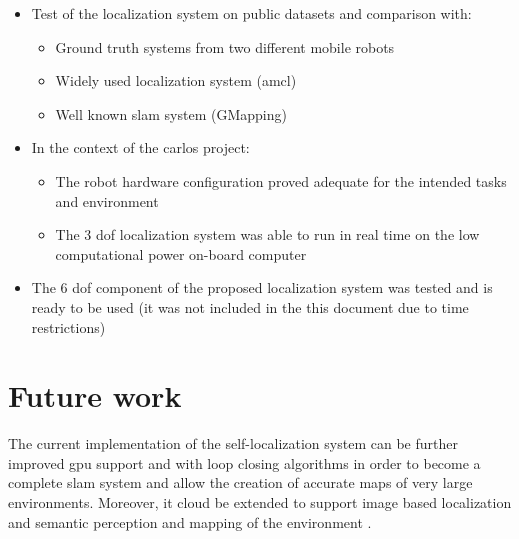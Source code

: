 \begin{itemize}
	\item Test of the localization system on public datasets and comparison with:
	\begin{itemize}
		\item Ground truth systems from two different mobile robots
		\item Widely used localization system (\gls{amcl})
		\item Well known \gls{slam} system (GMapping)
	\end{itemize}
 	
	\item In the context of the \gls{carlos} project:
	\begin{itemize}
		\item The robot hardware configuration proved adequate for the intended tasks and environment
		\item The 3 \gls{dof} localization system was able to run in real time on the low computational power on-board computer
	\end{itemize}
	
	\item The 6 \gls{dof} component of the proposed localization system was tested and is ready to be used (it was not included in the this document due to time restrictions)
\end{itemize}



\section{Future work}
The current implementation of the self-localization system can be further improved \gls{gpu} support and with loop closing algorithms \cite{Grisetti2012} \cite{Tamaki2010} in order to become a complete \gls{slam} system and allow the creation of accurate maps of very large environments. Moreover, it cloud be extended to support image based localization \cite{Labb2014} and semantic perception and mapping of the environment \cite{Santos2013}.

